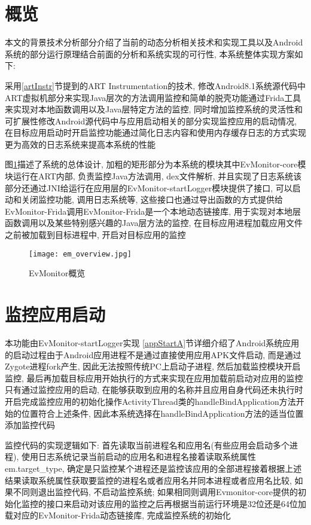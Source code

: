 \section{概览}
本文的背景技术分析部分介绍了当前的动态分析相关技术和实现工具以及Android系统的部分运行原理\juhao 结合前面的分析和系统实现的可行性, 本系统整体实现方案如下:

采用\ref{artInstr}节提到的ART Instrumentation的技术, 修改Android8.1系统源代码中ART虚拟机部分来实现Java层次的方法调用监控和简单的脱壳功能\juhao 通过Frida工具来实现对本地函数调用以及Java层特定方法的监控, 同时增加监控系统的灵活性和可扩展性\juhao 修改Android源代码中与应用启动相关的部分实现监控应用的启动情况, 在目标应用启动时开启监控功能\juhao 通过简化日志内容和使用内存缓存日志的方式实现更为高效的日志系统来提高本系统的性能\juhao

图\ref{emOverview}描述了系统的总体设计, 加粗的矩形部分为本系统的模块\juhao 其中EvMonitor-core模块运行在ART内部, 负责监控Java方法调用, dex文件解析, 并且实现了日志系统\juhao 该部分还通过JNI给运行在应用层的EvMonitor-startLogger模块提供了接口, 可以启动和关闭监控功能, 调用日志系统等, 这些接口也通过导出函数的方式提供给EvMonitor-Frida调用\juhao EvMonitor-Frida是一个本地动态链接库, 用于实现对本地层函数调用以及某些特别感兴趣的Java层方法的监控, 在目标应用进程加载应用文件之前被加载到目标进程中, 开启对目标应用的监控\juhao 
\begin{figure}[ht]
	\centering
	\texttt{[image: em\_overview.jpg]}
	\caption{EvMonitor概览}
	\label{emOverview}
\end{figure}

\section{监控应用启动}
本功能由EvMonitor-startLogger实现\juhao 
\ref{appStartA}节详细介绍了Android系统应用的启动过程\juhao 由于Android应用进程不是通过直接使用应用APK文件启动, 而是通过Zygote进程fork产生, 因此无法按照传统PC上启动子进程, 然后加载监控模块开启监控, 最后再加载目标应用开始执行的方式来实现在应用加载前启动对应用的监控\juhao 只有通过监控应用的启动, 在能够获取到应用的名称并且应用自身代码还未执行时开启完成监控应用的初始化操作\juhao ActivityThread类的handleBindApplication方法开始的位置符合上述条件, 因此本系统选择在handleBindApplication方法的适当位置添加监控代码\juhao 

监控代码的实现逻辑如下:
首先读取当前进程名和应用名(有些应用会启动多个进程), 使用日志系统记录当前启动的应用名和进程名\juhao 接着读取系统属性em.target\_type, 确定是只监控某个进程还是监控该应用的全部进程\juhao 接着根据上述结果读取系统属性获取要监控的进程名或者应用名并同本进程或者应用名比较, 如果不同则退出监控代码, 不启动监控系统; 如果相同则调用Evmonitor-core提供的初始化监控的接口来启动对该应用的监控\juhao 之后再根据当前运行环境是32位还是64位加载对应的EvMonitor-Frida动态链接库, 完成监控系统的初始化\juhao 


